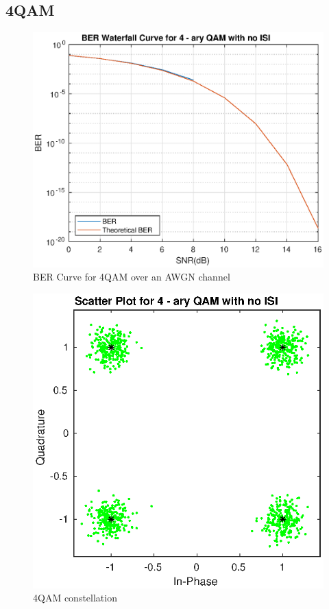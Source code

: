 \documentclass[conference]{IEEEtran}
\begin{document}
\subsection{4QAM}
\begin{figure}[htbp]
\centerline{\includegraphics[scale=.5]{./media/4qam.eps}}
\caption{BER Curve for 4QAM over an AWGN channel}
\label{4ber}
\end{figure}
\begin{figure}[htbp]
\centerline{\includegraphics[scale=.5]{./media/4qam_scatter.eps}}
\caption{4QAM constellation}
\label{4star}
\end{figure}
\end{document}

